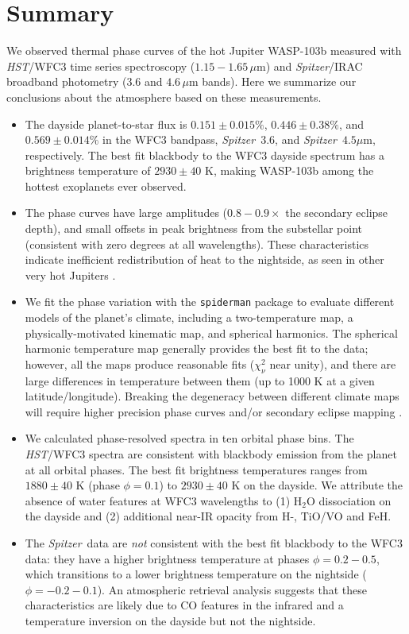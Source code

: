 \documentclass[twocolumn, trackchanges]{aastex61}
\newcommand{\project}[1]{\textsl{#1}}
\newcommand{\HST}{\project{HST}}
\newcommand{\Spitzer}{\project{Spitzer}}
\begin{document}
\section{Summary}
\label{sec:summary}
We observed thermal phase curves of the hot Jupiter WASP-103b measured with \HST/WFC3 time series spectroscopy ($1.15 - 1.65\,\mu$m) and \Spitzer/IRAC broadband photometry ($3.6$ and $4.6\,\mu$m bands). Here we summarize our conclusions about the atmosphere based on these measurements.

\begin{itemize}
	\item{The dayside planet-to-star flux is $0.151\pm0.015\%$, $0.446\pm0.38\%$, and $0.569\pm0.014\%$ in the WFC3 bandpass, \Spitzer\ $3.6$, and \Spitzer\ $4.5\mu$m, respectively.  The best fit blackbody to the WFC3 dayside spectrum has a brightness temperature of $2930 \pm 40$ K, making WASP-103b among the hottest exoplanets ever observed.}
	\item{The phase curves have large amplitudes ($0.8 -0.9\times$ the secondary eclipse depth), and small offsets in peak brightness from the substellar point (consistent with zero degrees at all wavelengths). These characteristics indicate inefficient redistribution of heat to the nightside, as seen in other very hot Jupiters \citep{komacek17}.} 
	\item{We fit the phase variation with the \texttt{spiderman} package \citep{louden17} to evaluate different models of the planet's climate, including a two-temperature map, a physically-motivated kinematic map, and spherical harmonics. The spherical harmonic temperature map generally provides the best fit to the data; however, all the maps produce reasonable fits ($\chi^2_\nu$ near unity), and there are large differences in temperature between them (up to 1000 K at a given latitude/longitude). Breaking the degeneracy between different climate maps will require higher precision phase curves and/or secondary eclipse mapping \citep[e.g.][]{dewit12}.}
\item{We calculated phase-resolved spectra in ten orbital phase bins. The \HST/WFC3 spectra are consistent with  blackbody emission from the planet at all orbital phases. The best fit brightness temperatures ranges from $1880\pm40$ K (phase $\phi = 0.1$) to $2930\pm40$ K on the dayside. We attribute the absence of water features at WFC3 wavelengths to (1) H$_2$O dissociation on the dayside and (2) additional near-IR opacity from H-, TiO/VO and FeH.}
\item{The \Spitzer\ data are \emph{not} consistent with the best fit blackbody to the WFC3 data: they have a higher brightness temperature at phases $\phi = 0.2 - 0.5$, which transitions to a lower brightness temperature on the nightside ($\phi = -0.2 - 0.1$). An atmospheric retrieval analysis suggests that these characteristics are likely due to CO features in the infrared and a temperature inversion on the dayside but not the nightside.}

\end{itemize}
\end{document}
